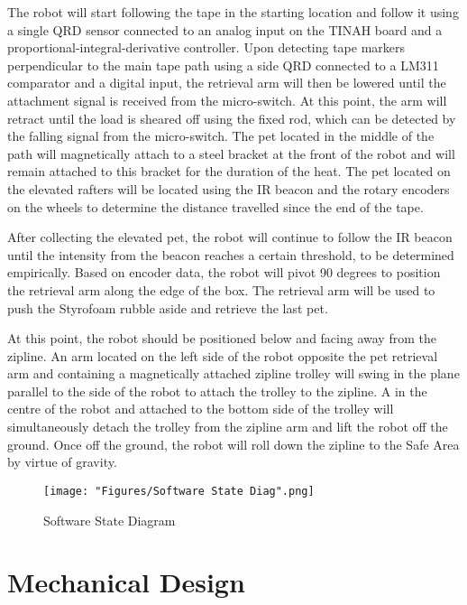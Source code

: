 \documentclass[11pt, oneside]{article} %
\begin{document}
The robot will start following the tape in the starting location and follow it using a single QRD sensor connected to an analog input on the TINAH board and a proportional-integral-derivative controller. Upon detecting tape markers perpendicular to the main tape path using a side QRD connected to a LM311 comparator and a digital input, the retrieval arm will then be lowered until the attachment signal is received from the micro-switch. At this point, the arm will retract until the load is sheared off using the fixed rod, which can be detected by the falling signal from the micro-switch. The pet located in the middle of the path will magnetically attach to a steel bracket at the front of the robot and will remain attached to this bracket for the duration of the heat. The pet located on the elevated rafters will be located using the IR beacon and the rotary encoders on the wheels to determine the distance travelled since the end of the tape.

After collecting the elevated pet, the robot will continue to follow the IR beacon until the intensity from the beacon reaches a certain threshold, to be determined empirically. Based on encoder data, the robot will pivot 90 degrees to position the retrieval arm along the edge of the box. The retrieval arm will be used to push the Styrofoam rubble aside and retrieve the last pet.

At this point, the robot should be positioned below and facing away from the zipline. An arm located on the left side of the robot opposite the pet retrieval arm and containing a magnetically attached zipline trolley will swing in the plane parallel to the side of the robot to attach the trolley to the zipline. A  in the centre of the robot and attached to the bottom side of the trolley will simultaneously detach the trolley from the zipline arm and lift the robot off the ground. Once off the ground, the robot will roll down the zipline to the Safe Area by virtue of gravity.

\begin{figure}[h]
	\centering
	\texttt{[image: "Figures/Software State Diag".png]}
	\caption[Software State Diagram]{Software State Diagram}
	\label{fig:SoftStates}
\end{figure}

\section{Mechanical Design}
\end{document}
